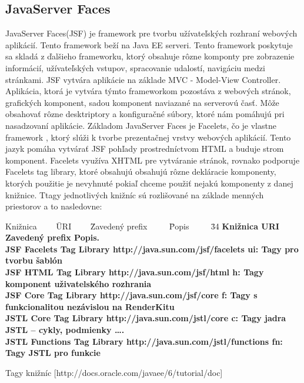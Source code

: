\subsection{JavaServer Faces}
JavaServer Faces(JSF)  je framework pre tvorbu užívateľských rozhraní webových aplikácií. Tento framework beží na Java EE serveri. Tento framework poskytuje sa skladá z ďalšieho frameworku, ktorý obsahuje rôzne komponty pre zobrazenie informácií, užívateľských vstupov, spracovanie udalostí, navigáciu medzi stránkami. JSF vytvára aplikácie na základe MVC - Model-View Controller. Aplikácia, ktorá je vytvára týmto frameworkom pozostáva z webových stránok, grafických komponent, sadou komponent naviazané na serverovú časť. Môže obsahovať rôzne desktriptory a konfiguračné súbory, ktoré nám pomáhujú pri nasadzovaní aplikácie. Základom JavaServer Faces je Facelets, čo je vlastne framework , ktorý slúži k tvorbe prezentačnej vrstvy webových aplikácií. Tento jazyk pomáha vytvárať JSF pohľady prostredníctvom HTML a buduje strom komponent. Facelets využíva XHTML pre vytváranie stránok, rovnako podporuje Facelets tag library, ktoré obsahujú obsahujú rôzne dekláracie komponenty, ktorých použitie je nevyhnuté pokiaľ chceme použiť nejakú komponenty z danej knižnice. Ttagy jednotlivých knižníc sú rozlišované na základe menných priestorov a to nasledovne: 
 
\begin{table}

  \begin{tabbing}
    Knižnica ~~~~\= URI ~~~~\= Zavedený prefix ~~~~ \= Popis ~~~~
    \= 34 \kill
    \bfseries Knižnica \>
    \bfseries URI \>
        \bfseries Zavedený prefix \>
    \bfseries Popis. \\[2mm]
   JSF Facelets Tag Library \> 	http://java.sun.com/jsf/facelets  \>	ui:  \>	Tagy pro tvorbu šablón \\
JSF HTML Tag Library  \>	http://java.sun.com/jsf/html  \>	h:  \>	Tagy komponent uživatelského rozhrania \\
JSF Core Tag Library  \>	http://java.sun.com/jsf/core  \>	f: 	 \> Tagy s funkcionalitou nezávislou na RenderKitu \\
JSTL Core Tag Library  \>	http://java.sun.com/jstl/core  \>	c:  \>	Tagy jadra JSTL – cykly, podmienky \ldots. \\
JSTL Functions Tag Library   \> http://java.sun.com/jstl/functions  \>	fn:  \>	Tagy JSTL pro funkcie  \\
    \end{tabbing}
\caption{Tagy knižníc [http://docs.oracle.com/javaee/6/tutorial/doc]}
\end{table}

